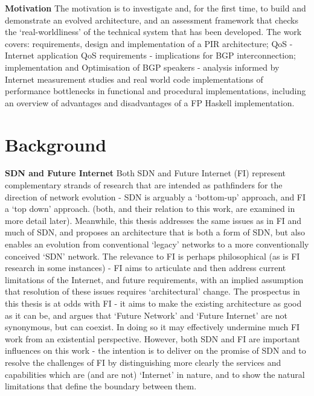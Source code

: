 \textbf{Motivation}
The motivation is to investigate and, for the first time, to build and demonstrate an evolved architecture, and an assessment framework that checks the `real-worldliness' of the technical system that has been developed. The work covers: requirements, design and implementation of a PIR architecture;
QoS - Internet application QoS requirements - implications for BGP interconnection;
implementation and Optimisation of BGP speakers - analysis informed by Internet measurement studies and real world code implementations of performance bottlenecks in functional and procedural implementations, including an overview of advantages and disadvantages of a FP Haskell implementation.


\section{Background}
\textbf{SDN and Future Internet}
Both SDN and Future Internet (FI) represent complementary strands of research that are intended as pathfinders for the direction of network evolution - SDN is arguably a ‘bottom-up' approach, and FI a ‘top down’ approach.
(both, and their relation to this work, are examined in more detail later). Meanwhile, this thesis addresses the same issues as in FI and much of SDN, and proposes an architecture that is both a form of SDN, but also enables an evolution from conventional ‘legacy’ networks to a more conventionally conceived ‘SDN’ network.
The relevance to FI is perhaps philosophical (as is FI research in some instances) - FI aims to articulate and then address current limitations of the Internet, and future requirements, with an implied assumption that resolution of these issues requires ‘architectural’ change.
The prospectus in this thesis is at odds with FI - it aims to make the existing architecture as good as it can be, and argues that ‘Future Network’ and ‘Future Internet’ are not synonymous, but can coexist.
In doing so it may effectively undermine much FI work from an existential perspective.
However, both SDN and FI are important influences on this work - the intention is to deliver on the promise of SDN and to resolve the challenges of FI by distinguishing more clearly the services and capabilities which are (and are not) ‘Internet’ in nature, and to show the natural limitations that define the boundary between them.
\medskip

